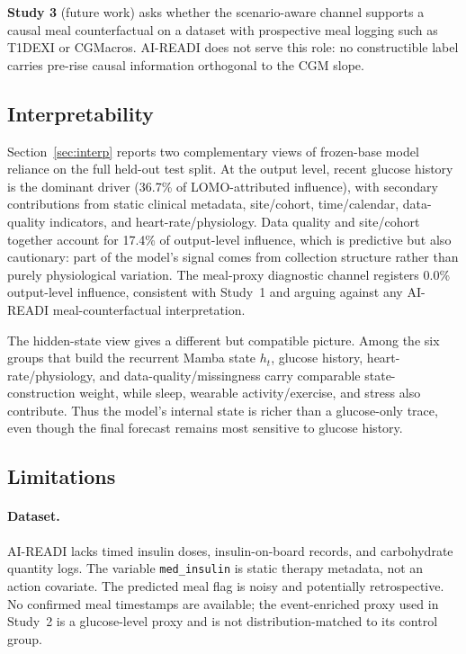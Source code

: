 \textbf{Study 3} (future work) asks whether the scenario-aware channel supports
a causal meal counterfactual on a dataset with prospective meal logging such as
T1DEXI or CGMacros.
AI-READI does not serve this role: no constructible label carries pre-rise
causal information orthogonal to the CGM slope.

\subsection{Interpretability}
\label{subsec:discuss_interp}

Section~\ref{sec:interp} reports two complementary views of frozen-base model
reliance on the full held-out test split.
At the output level, recent glucose history is the dominant driver
(36.7\% of LOMO-attributed influence), with secondary contributions from static
clinical metadata, site/cohort, time/calendar, data-quality indicators, and
heart-rate/physiology.
Data quality and site/cohort together account for 17.4\% of output-level
influence, which is predictive but also cautionary: part of the model's signal
comes from collection structure rather than purely physiological variation.
The meal-proxy diagnostic channel registers 0.0\% output-level influence,
consistent with Study~1 and arguing against any AI-READI meal-counterfactual
interpretation.

The hidden-state view gives a different but compatible picture.
Among the six groups that build the recurrent Mamba state $h_t$, glucose
history, heart-rate/physiology, and data-quality/missingness carry comparable
state-construction weight, while sleep, wearable activity/exercise, and stress
also contribute.
Thus the model's internal state is richer than a glucose-only trace, even
though the final forecast remains most sensitive to glucose history.

\subsection{Limitations}
\label{subsec:discuss_limitations}

\paragraph{Dataset.}
AI-READI lacks timed insulin doses, insulin-on-board records, and carbohydrate
quantity logs.
The variable \texttt{med\_insulin} is static therapy metadata, not an action
covariate.
The predicted meal flag is noisy and potentially retrospective.
No confirmed meal timestamps are available; the event-enriched proxy used in
Study~2 is a glucose-level proxy and is not distribution-matched to its control
group.

